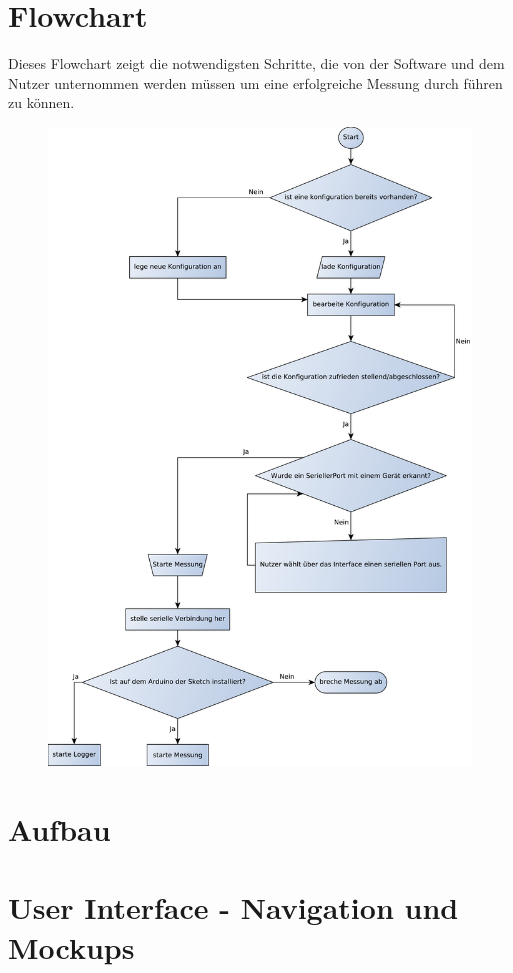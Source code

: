 \section{Flowchart}
Dieses Flowchart zeigt die notwendigsten Schritte, die von der Software und dem Nutzer unternommen werden müssen um eine erfolgreiche Messung durch führen zu können. 
\begin{figure}[H]
 \centering
 \includegraphics[width=\textwidth, keepaspectratio=true]{../Diagramme/SoftwareFlowChart.pdf}
\end{figure}
\section{Aufbau}
\section{User Interface - Navigation und Mockups}